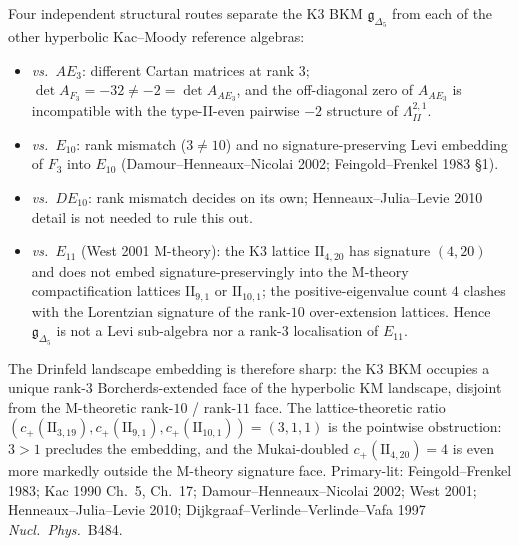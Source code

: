 \begin{remark}
\label{rem:latfnd-w19-drinfeld-landscape-separation}
Four independent structural routes separate the K3 BKM
$\mathfrak{g}_{\Delta_5}$ from each of the other hyperbolic Kac--Moody
reference algebras:
\begin{itemize}
\item \emph{vs.\ $AE_3$}: different Cartan matrices at rank $3$;
 $\det A_{F_3} = -32 \neq -2 = \det A_{AE_3}$, and the off-diagonal
 zero of $A_{AE_3}$ is incompatible with the type-II-even pairwise
 $-2$ structure of $\Lambda^{2,1}_{II}$.
\item \emph{vs.\ $E_{10}$}: rank mismatch ($3 \neq 10$) and no
 signature-preserving Levi embedding of $F_3$ into $E_{10}$
 (Damour--Henneaux--Nicolai 2002; Feingold--Frenkel 1983 \S1).
\item \emph{vs.\ $DE_{10}$}: rank mismatch decides on its own;
 Henneaux--Julia--Levie 2010 detail is not needed to rule this out.
\item \emph{vs.\ $E_{11}$} (West 2001 M-theory): the K3 lattice
 $\mathrm{II}_{4,20}$ has signature $(4, 20)$ and does not embed
 signature-preservingly into the M-theory compactification lattices
 $\mathrm{II}_{9,1}$ or $\mathrm{II}_{10,1}$; the positive-eigenvalue
 count $4$ clashes with the Lorentzian signature of the rank-$10$
 over-extension lattices. Hence
 $\mathfrak{g}_{\Delta_5}$ is not a Levi sub-algebra nor a
 rank-$3$ localisation of $E_{11}$.
\end{itemize}
The Drinfeld landscape embedding is therefore sharp: the K3
BKM occupies a unique rank-$3$ Borcherds-extended face of the
hyperbolic KM landscape, disjoint from the M-theoretic rank-$10$ /
rank-$11$ face. The lattice-theoretic ratio
$(c_+(\mathrm{II}_{3,19}), c_+(\mathrm{II}_{9,1}), c_+(\mathrm{II}_{10,1})) = (3, 1, 1)$
is the pointwise obstruction: $3 > 1$ precludes the embedding, and
the Mukai-doubled $c_+(\mathrm{II}_{4,20}) = 4$ is even more
markedly outside the M-theory signature face.
Primary-lit: Feingold--Frenkel 1983; Kac 1990 Ch.~5, Ch.~17;
Damour--Henneaux--Nicolai 2002; West 2001;
Henneaux--Julia--Levie 2010;
Dijkgraaf--Verlinde--Verlinde--Vafa 1997 \emph{Nucl.\ Phys.}~B484.
\end{remark}

